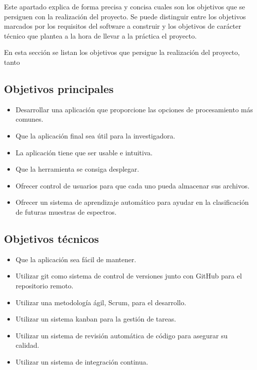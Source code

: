 
Este apartado explica de forma precisa y concisa cuales son los objetivos que se persiguen con la realización del proyecto. Se puede distinguir entre los objetivos marcados por los requisitos del software a construir y los objetivos de carácter técnico que plantea a la hora de llevar a la práctica el proyecto.

En esta sección se listan los objetivos que persigue la realización del proyecto, tanto 

\subsection{Objetivos principales}
\begin{itemize}
	\tightlist
	\item Desarrollar una aplicación que proporcione las opciones de procesamiento más comunes.
	\item Que la aplicación final sea útil para la investigadora.
	\item La aplicación tiene que ser usable e intuitiva.
	\item Que la herramienta se consiga desplegar.
	\item Ofrecer control de usuarios para que cada uno pueda almacenar sus archivos.
	\item Ofrecer un sistema de aprendizaje automático para ayudar en la clasificación de futuras muestras de espectros.
\end{itemize}

\subsection{Objetivos técnicos}
\begin{itemize}
	\tightlist
	\item Que la aplicación sea fácil de mantener.
	\item Utilizar git como sistema de control de versiones junto con GitHub para el repositorio remoto.
	\item Utilizar una metodología ágil, Scrum, para el desarrollo.
	\item Utilizar un sistema kanban para la gestión de tareas.
	\item Utilizar un sistema de revisión automática de código para asegurar su calidad.
	\item Utilizar un sistema de integración continua.
\end{itemize}

